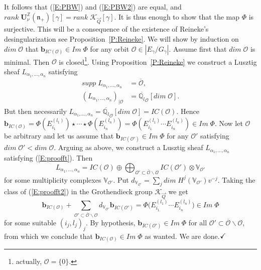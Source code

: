 \documentclass[a4paper,10pt]{amsart}
\def\Z{\mathbb{Z}}
\def\U{\mathbf{U}}
\def\qed{$\hfill \checkmark$}
\def\a{\alpha}
\def\qlb{\overline{\mathbb{Q}_l}}
\def\n{\mathfrak{n}}
\def\KQ{\mathcal{K}_{\vec{Q}}}
\numberwithin{equation}{section}
\begin{document}
\vspace{.1in}

It follows that (\ref{E:PBW}) and (\ref{E:PBW2}) are equal, and $rank\;\U^{\Z}_{\nu}(\n_+)[\gamma]=rank\;\mathcal{K}_{\vec{Q}}[\gamma]$.
It is thus enough to show that the map $\Phi$ is surjective. This will be a consequence of the existence of Reineke's desingularization see Proposition~\ref{P:Reineke}. We will show by induction on $dim\;\mathcal{O}$ that $\mathbf{b}_{IC(\mathcal{O})} \in Im\;\Phi$ for any orbit $\mathcal{O} \in |E_{\gamma}/G_{\gamma}|$. Assume first that $dim\;\mathcal{O}$ is minimal. Then $\mathcal{O}$ is closed\footnote{actually, $\mathcal{O}=\{0\}$.}.
Using Proposition~\ref{P:Reineke} we construct a Lusztig sheaf $L_{\a_1, \ldots, \a_n}$ satisfying
\begin{equation}\label{E:proofft}
\begin{split}
supp\; L_{\a_1, \ldots, \a_n} &=\overline{\mathcal{O}},\\
(L_{\a_1, \ldots, \a_n})_{|\mathcal{O}}&=\qlb_{\mathcal{O}} [dim\;\mathcal{O}].
\end{split}
\end{equation}
But then necessarily $L_{\a_1, \ldots, \a_n}=\qlb_{\mathcal{O}}[dim\;\mathcal{O}]=IC(\mathcal{O})$. Hence $\mathbf{b}_{IC(\mathcal{O})}=\Phi(E_{i_1}^{(l_1)}) \star \cdots \star \Phi(E_{i_n}^{(l_n)})=\Phi( E_{i_1}^{(l_1)} \cdots E_{i_n}^{(l_n)}) \in Im\;\Phi$. Now let $\mathcal{O}$ be arbitrary and let us assume that $\mathbf{b}_{IC(\mathcal{O}')} \in Im\;\Phi$ for any $\mathcal{O}'$ satisfying $dim\;\mathcal{O}' < dim\;\mathcal{O}$. Arguing as above, we construct a Lusztig sheaf $L_{\a_1, \ldots, \a_n}$ satisfying (\ref{E:proofft}). Then
\begin{equation}\label{E:proofft2}
L_{\a_1, \ldots, \a_n}=IC(\mathcal{O}) \oplus \bigoplus_{\mathcal{O}' \subset \overline{\mathcal{O}} \backslash \mathcal{O}} IC(\mathcal{O}') \otimes \mathbb{V}_{\mathcal{O}'}
\end{equation}
for some multiplicity complexes $\mathbb{V}_{\mathcal{O}'}$. Put $d_{\mathbb{V}_{\mathcal{O}'}}=\sum_j dim\;H^j(\mathbb{V}_{{\mathcal{O}'}}) v^{-j}$. Taking the class of (\ref{E:proofft2}) in the Grothendieck group $\KQ$ we get
$$\mathbf{b}_{IC(\mathcal{O})} + \sum_{\mathcal{O}' \subset \overline{\mathcal{O}} \backslash \mathcal{O}} d_{\mathbb{V}_{\mathcal{O}'}} \mathbf{b}_{IC(\mathcal{O}')}=\Phi\big(E_{i_1}^{(l_1)} \cdots E_{i_n}^{(l_n)}\big) \in Im\;\Phi$$
for some suitable $(i_j,l_j)_{j}$. By hypothesis, $\mathbf{b}_{IC(\mathcal{O}')}\in Im\;\Phi$ for all $\mathcal{O}' \subset \overline{\mathcal{O}} \backslash \mathcal{O}$, from which we conclude that $\mathbf{b}_{IC(\mathcal{O})} \in Im\;\Phi$ as wanted. We are done.\qed
\end{document}

